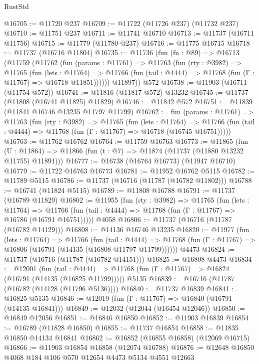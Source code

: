 \begin{lexlean}{RustStd}
\begin{coremodule}
@16705 := @11720 @237
@16709 := @11722 (@11726 @237) (@11732 @237)
@16710 := @11751 @237
@16711 := @11741 @16710
@16713 := @11737 (@16711 @11756)
@16715 := @11779 (@11780 @237)
@16716 := @11775 @16715
@16718 := @11737 (@16716 @11804)
@16735 := @11736
    (fun (fn : @89) =>
    @16713
      (@11759
        (@11762
          (fun (params : @11761) =>
          @11763
            (fun (rty : @3982) =>
            @11765
              (fun (lets : @11764) =>
              @11766 (fun (tail : @4444) => @11768 (fun (Γ : @11767) => @16718 @11851))))))
        @11897))
    @572
@16738 := @11903 (@16711 (@11754 @572))
@16741 := @11816 (@11817 @572) @13232
@16745 := @11737 (@11808 (@16741 @11825) @11829)
@16746 := @11842 @572
@16751 := @11839 (@11841 @16746 @13235 @11797 @11799)
@16762 := fun (params : @11761) =>
  @11763
    (fun (rty : @3982) =>
    @11765
      (fun (lets : @11764) =>
      @11766 (fun (tail : @4444) => @11768 (fun (Γ : @11767) => @16718 (@16745 @16751)))))
@16763 := @11762 @16762
@16764 := @11759 @16763
@16773 := @11865
    (fun (U : @11864) => @11866 (fun (t : @7) => @11874 (@11737 (@11880 @13232 @11755) @11891)))
@16777 := @16738 (@16764 @16773) (@11947 @16710)
@16779 := @11722 @16763 @16773
@16781 := @11952 @16762 @5115
@16782 := @11789 @5115
@16786 := @11737 (@16716 (@11787 (@16782 @11802)))
@16788 := @16741 (@11824 @5115)
@16789 := @11808 @16788
@16791 := @11737 (@16789 @11829)
@16802 := @11955
    (fun (rty : @3982) =>
    @11765
      (fun (lets : @11764) =>
      @11766 (fun (tail : @4444) => @11768 (fun (Γ : @11767) => @16786 (@16791 @16751)))))
    @4058
@16806 := @11737 (@16716 (@11787 (@16782 @14129)))
@16808 := @14136 @16746 @13235
@16820 := @11977
    (fun (lets : @11764) =>
    @11766
      (fun (tail : @4444) =>
      @11768 (fun (Γ : @11767) => @16806 (@16791 (@14135 (@16808 @11797 @11799))))))
    @4473
@16824 := @11737 (@16716 (@11787 (@16782 @14151)))
@16825 := @16808 @4473
@16834 := @12001
    (fun (tail : @4444) => @11768 (fun (Γ : @11767) => @16824 (@16791 (@14135 (@16825 @11799)))))
    @5135
@16839 := @16716 (@11787 (@16782 (@14128 (@11796 @5136))))
@16840 := @11737 @16839
@16841 := @16825 @5135
@16846 := @12019 (fun (Γ : @11767) => @16840 (@16791 (@14135 @16841)))
@16849 := @12032 (@12044 (@16454 @12046))
@16850 := @16849 @12056
@16851 := @16846 @16850
@16852 := @11903 @16839
@16854 := @16789 (@11828 @16850)
@16855 := @11737 @16854
@16858 := @11835 @16850 @14134 @16841
@16862 := @16852 (@16855 @16858) (@12069 @16715)
@16866 := @11903 @16854 @16858 (@12074 @16788)
@16876 := @12648 @16850 @4068 @184 @106 @570 @12654 @4473 @5134 @4551 @12663

\end{coremodule}
\end{lexlean}
